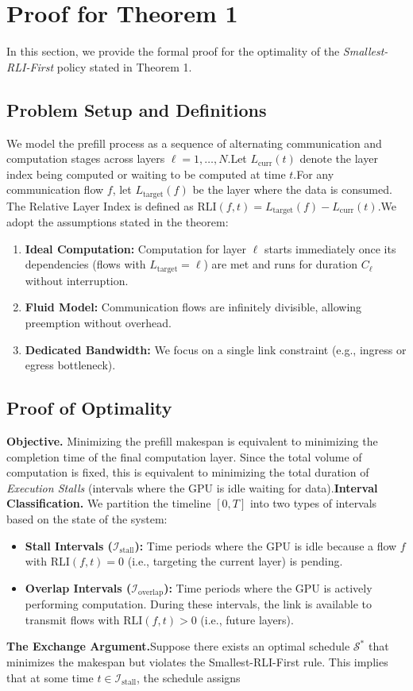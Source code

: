 \appendix

\section{Proof for Theorem 1}\label{sec:appendix:The1}

In this section, we provide the formal proof for the optimality of the \emph{Smallest-RLI-First} policy stated in Theorem 1.\subsection{Problem Setup and Definitions}We model the prefill process as a sequence of alternating communication and computation stages across layers $\ell = 1, \dots, N$.Let $L_{\text{curr}}(t)$ denote the layer index being computed or waiting to be computed at time $t$.For any communication flow $f$, let $L_{\text{target}}(f)$ be the layer where the data is consumed. The Relative Layer Index is defined as $\text{RLI}(f, t) = L_{\text{target}}(f) - L_{\text{curr}}(t)$.We adopt the assumptions stated in the theorem:\begin{enumerate}\item[(i)] \textbf{Ideal Computation:} Computation for layer $\ell$ starts immediately once its dependencies (flows with $L_{\text{target}} = \ell$) are met and runs for duration $C_\ell$ without interruption.\item[(ii)] \textbf{Fluid Model:} Communication flows are infinitely divisible, allowing preemption without overhead.\item[(iii)] \textbf{Dedicated Bandwidth:} We focus on a single link constraint (e.g., ingress or egress bottleneck).\end{enumerate}\subsection{Proof of Optimality}\textbf{Objective.} Minimizing the prefill makespan is equivalent to minimizing the completion time of the final computation layer. Since the total volume of computation is fixed, this is equivalent to minimizing the total duration of \emph{Execution Stalls} (intervals where the GPU is idle waiting for data).\textbf{Interval Classification.} We partition the timeline $[0, T]$ into two types of intervals based on the state of the system:\begin{itemize}\item \textbf{Stall Intervals ($\mathcal{I}_{\text{stall}}$):} Time periods where the GPU is idle because a flow $f$ with $\text{RLI}(f, t) = 0$ (i.e., targeting the current layer) is pending.\item \textbf{Overlap Intervals ($\mathcal{I}_{\text{overlap}}$):} Time periods where the GPU is actively performing computation. During these intervals, the link is available to transmit flows with $\text{RLI}(f, t) > 0$ (i.e., future layers).\end{itemize}\textbf{The Exchange Argument.}Suppose there exists an optimal schedule $\mathcal{S}^*$ that minimizes the makespan but violates the Smallest-RLI-First rule. This implies that at some time $t \in \mathcal{I}_{\text{stall}}$, the schedule assigns 
